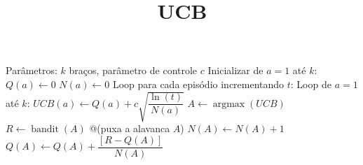 \documentclass[brazilian,preview]{standalone}
\title{UCB}
\begin{document}
\begin{algorithm}
Parâmetros: $k$ braços, parâmetro de controle $c$
Inicializar de $a=1$ até $k$:
    $Q(a) \leftarrow 0$ 
    $N(a) \leftarrow 0$ 
Loop para cada episódio incrementando $t$:
    Loop de $a=1$ até $k$:
        $\mathit{UCB}(a) \leftarrow Q(a) + c \sqrt{\dfrac{\ln(t)}{N(a)}}$ 
    $A \leftarrow \operatorname{argmax}(\mathit{UCB})$ 
    $R \leftarrow \operatorname{bandit}(A)$ @\hfill@ (puxa a alavanca $A$)
    $N(A) \leftarrow N(A) + 1$
    $Q(A) \leftarrow Q(A) + \dfrac{[R - Q(A)]}{N(A)}$
\end{algorithm}
\end{document}
